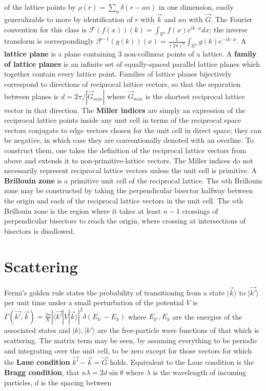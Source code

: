 \documentclass[10pt]{article}
\begin{document}
\begin{tiny}
of the lattice points by $\rho(r)=\sum_{n}\delta(r-an)$ in one dimension,
easily generalizable to more by identification of $r$ with $\vec{k}$ and $an$ with $\vec{G}$.
The Fourier convention for this class is
$\mathcal{F}(f(x))(k)=\int_{\mathbb{R}^{n}}f(x)e^{ik\cdot x}dx$;
the inverse transform is correspondingly
$\mathcal{F}^{-1}(g(k))(x)=\frac{1}{(2\pi)^{n}}\int_{\mathbb{R}^{n}}g(k)e^{-ik\cdot x}$.
A \textbf{lattice plane} is a plane containing 3 non-collinear points of a lattice.
A \textbf{family of lattice planes} is an infinite set of equally-spaced parallel lattice planes which together contain
every lattice point.
Families of lattice planes bijectively correspond to directions of reciprocal lattice vectors,
so that the separation between planes is $d=2\pi/|\vec{G}_{min}|$ where $\vec{G}_{min}$ is the shortest reciprocal lattice vector
in that direction.
The \textbf{Miller indices} are simply an expression of the reciprocal lattice points inside any unit cell in terms of the reciprocal
space vectors conjugate to edge vectors chosen for the unit cell in direct space;
they can be negative, in which case they are conventionally denoted with an overline.
To construct them, one takes the definition of the reciprocal lattice vectors from above and extends it to non-primitive-lattice
vectors.
The Miller indices do not necessarily represent reciprocal lattice vectors unless the unit cell is primitive.
A \textbf{Brillouin zone} is a primitive unit cell of the reciprocal lattice.
The $n$th Brillouin zone may be constructed by taking the perpendicular bisector halfway between the origin and each of the
reciprocal lattice vectors in the unit cell.
The $n$th Brillouin zone is the region where it takes at least $n-1$ crossings of perpendicular bisectors to reach the origin,
where crossing at intersections of bisectors is disallowed.

\section*{Scattering}
Fermi's golden rule states the probability of transitioning from a state $|\vec{k}\rangle$ to $|\vec{k'}\rangle$ per unit time
under a small perturbation of the potential $V$ is
$\Gamma(\vec{k'},\vec{k})=\frac{2\pi}{\hbar}|\langle \vec{k'}|V|\vec{k} \rangle|^{2}\delta(E_{k'}-E_{k})$ where $E_{k'},E_{k}$
are the energies of the associated states and $|k\rangle,|k'\rangle$ are the free-particle wave functions of that which is scattering.
The matrix term may be seen, by assuming everything to be periodic and integrating over the unit cell, to be zero except for those
vectors for which the \textbf{Laue condition} $\vec{k'}-\vec{k}=\vec{G}$ holds.
Equivalent to the Laue condition is the \textbf{Bragg condition}, that $n\lambda = 2d\sin\theta$ where $\lambda$ is the wavelength
of incoming particles, $d$ is the spacing between
\end{tiny}
\end{document}
